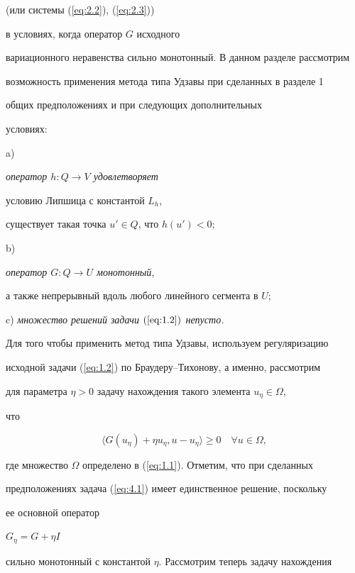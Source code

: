 (или системы (\ref{eq:2.2}), (\ref{eq:2.3})) 


в условиях, когда оператор $G$ исходного 


вариационного неравенства сильно монотонный. В данном разделе рассмотрим 


возможность применения метода типа Удзавы при сделанных в разделе 1 


общих предположениях и при следующих дополнительных 


условиях: 





a) {\em оператор $h : Q \rightarrow V$ удовлетворяет 


условию Липшица с константой $L_{h}$, 


существует такая точка $u' \in Q$, что $h(u') <0;$}





b) {\em оператор $G: Q \rightarrow U$ монотонный, 


а также непрерывный вдоль любого линейного сегмента в $U;$}





c) {\em множество решений задачи $(\ref{eq:1.2})$ непусто.}





Для того чтобы применить метод типа Удзавы, используем регуляризацию 


исходной задачи (\ref{eq:1.2}) по Браудеру--Тихонову, а именно, рассмотрим 


для параметра $\eta>0$ задачу нахождения такого элемента $u_{\eta}\in\Omega$, 


что


\begin{equation} \label{eq:4.1} 


\langle G(u_{\eta})+\eta u_{\eta}, u - u_{\eta} \rangle \geq 0


\quad \forall u \in \Omega , 


\end{equation}


где множество $\Omega$ определено в (\ref{eq:1.1}). Отметим, что при сделанных 


предположениях задача (\ref{eq:4.1}) имеет единственное решение, поскольку 


ее основной оператор 


$G_{\eta}=G+\eta I$


сильно монотонный с константой $\eta $. Рассмотрим теперь задачу нахождения 


